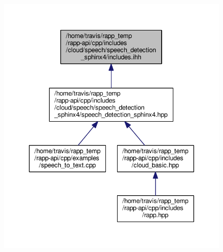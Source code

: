 \begin{figure}[H]
\begin{center}
\leavevmode
\includegraphics[width=335pt]{cloud_2speech_2speech__detection__sphinx4_2includes_8ihh__dep__incl}
\end{center}
\end{figure}
